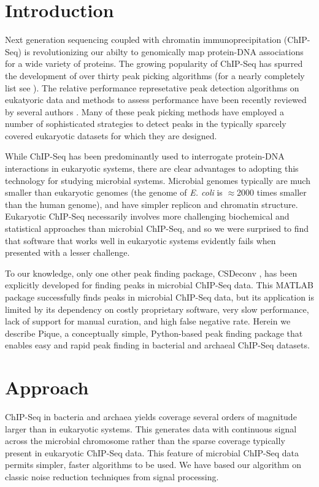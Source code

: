 \documentclass{bioinfo}
\begin{document}
\section{Introduction}

\noindent Next generation sequencing coupled with chromatin
immunoprecipitation (ChIP-Seq) is revolutionizing our abilty to
genomically map protein-DNA associations for a wide variety of
proteins.  The growing popularity of ChIP-Seq has spurred the
development of over thirty peak picking algorithms (for a nearly
completely list see \cite{wilbanks}). The relative performance
represetative peak detection algorithms on eukatyoric data and methods
to assess performance have been recently reviewed by several authors
\cite{Pepke, Laajala_review, too_many_peak_callers, peakranger,
  peak_benchmark}.  Many of these peak picking methods have employed a
number of sophisticated strategies to detect peaks in the typically
sparcely covered eukaryotic datasets for which they are designed.

While ChIP-Seq has been predominantly used to interrogate protein-DNA
interactions in eukaryotic systems, there are clear advantages to
adopting this technology for studying microbial systems. Microbial
genomes typically are much smaller than eukaryotic genomes (the genome
of {\em E. coli} is $\approx$2000 times smaller than the human
genome), and have simpler replicon and chromatin structure.
Eukaryotic ChIP-Seq necessarily involves more challenging biochemical
and statistical approaches than microbial ChIP-Seq, and so we were
surprised to find that software that works well in eukaryotic systems
evidently fails when presented with a lesser challenge.

To our knowledge, only one other peak finding package, CSDeconv
\cite{CSDeconv}, has been explicitly developed for finding peaks in
microbial ChIP-Seq data. This MATLAB package successfully finds peaks
in microbial ChIP-Seq data, but its application is limited by its
dependency on costly proprietary software, very slow performance, lack
of support for manual curation, and high false negative rate. Herein
we describe Pique, a conceptually simple, Python-based peak finding
package that enables easy and rapid peak finding in bacterial and
archaeal ChIP-Seq datasets.

\section{Approach}

\noindent ChIP-Seq in bacteria and archaea yields coverage several
orders of magnitude larger than in eukaryotic systems.  This generates
data with continuous signal across the microbial chromosome rather
than the sparse coverage typically present in eukaryotic ChIP-Seq
data.  This feature of microbial ChIP-Seq data permits simpler, faster
algorithms to be used. We have based our algorithm on classic noise
reduction techniques from signal processing.
\end{document}
